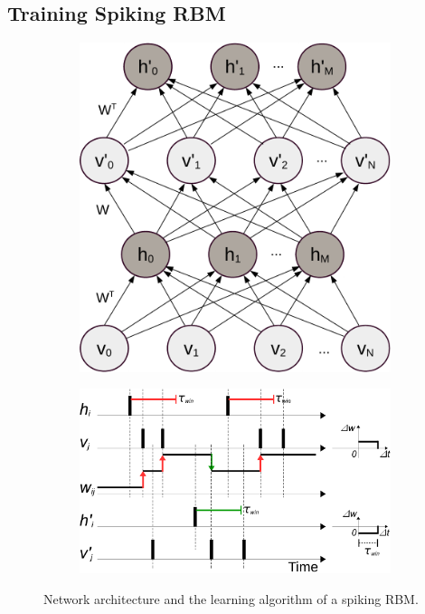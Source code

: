 \subsection{Training Spiking RBM}
\begin{figure}[h]
	\centering
		\begin{subfigure}[c]{0.33\textwidth}
			\includegraphics[width=\textwidth]{pics_sdlm/rbm.pdf}
		\end{subfigure}
		\begin{subfigure}[c]{0.66\textwidth}
			\includegraphics[width=\textwidth]{pics_sdlm/rSTDP_rbm.pdf}
		\end{subfigure}
	\caption{Network architecture and the learning algorithm of a spiking RBM.}
	\label{fig:sRBM}
\end{figure}

